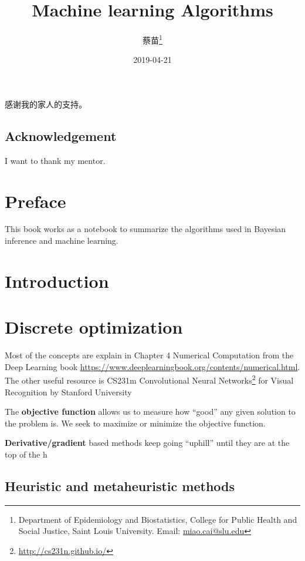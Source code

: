 \documentclass[fontset=fandol,zihao=false,scheme=chinese,heading=true,UTF8]{ctexbook}
\title{{\fontsize{26}{30}\selectfont \textbf{Machine learning Algorithms}}}
\author{蔡苗\footnote{Department of Epidemiology and Biostatistics, College for Public Health and Social Justice, Saint Louis University. Email: \url{miao.cai@slu.edu}}}
\date{2019-04-21}
\newenvironment{dedication}
{
   \cleardoublepage
   \thispagestyle{empty}
   \vspace*{\stretch{1}}
   \hfill\begin{minipage}[t]{0.66\textwidth}
   \raggedright
}
{
   \end{minipage}
   \vspace*{\stretch{3}}
   \clearpage
}
\renewcommand{\href}[2]{#2\footnote{\url{#1}}}
\begin{document}
\maketitle

\begin{dedication}
感谢我的家人的支持。
\end{dedication}

\section*{Acknowledgement}

I want to thank my mentor.

{
\setcounter{tocdepth}{2}
\tableofcontents
}
\listoftables
\listoffigures



\hypertarget{preface}{%
\chapter{Preface}\label{preface}}

This book works as a notebook to summarize the algorithms used in Bayesian inference and machine learning.

\mainmatter

\hypertarget{introduction}{%
\chapter{Introduction}\label{introduction}}

\hypertarget{discrete-optimization}{%
\chapter{Discrete optimization}\label{discrete-optimization}}

Most of the concepts are explain in Chapter 4 Numerical Computation from the Deep Learning book \url{https://www.deeplearningbook.org/contents/numerical.html}.
The other useful resource is \href{http://cs231n.github.io/}{CS231m Convolutional Neural Networks} for Visual Recognition by Stanford University

The \textbf{objective function} allows us to measure how ``good'' any given solution to the problem is.
We seek to maximize or minimize the objective function.

\textbf{Derivative/gradient} based methods keep going ``uphill'' until they are at the top of the h

\hypertarget{heuristic-and-metaheuristic-methods}{%
\section{Heuristic and metaheuristic methods}\label{heuristic-and-metaheuristic-methods}}
\end{document}

